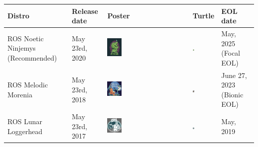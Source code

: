 \documentclass[../../main]{subfiles}
\begin{document}
\begin{table}[h!]
\begin{tcolorbox}[
    colback=red!5!white,colframe=red!75!black,
    title={\textbf{Built-in Field Types for Message Definition}},
    fonttitle=\bfseries, coltitle=white, width=\linewidth
]
    \centering
    \renewcommand{\arraystretch}{1} %
    \begin{longtable}{|
        >{\centering\arraybackslash}m{2.5cm}|
        >{\centering\arraybackslash}m{2cm}|
        >{\centering\arraybackslash}m{3cm}|
        >{\centering\arraybackslash}m{1.5cm}|
        >{\centering\arraybackslash}m{3cm}|}
    \hline 
    \rowcolor{red!20}
    \textbf{Distro} & \textbf{Release date} & \textbf{Poster} & \textbf{Turtle} & \textbf{EOL date} \\
    \hline \midrule

    ROS Noetic Ninjemys (Recommended) & May 23rd, 2020 & 
    \includegraphics[width=0.18\textwidth]{img/noetic.png} & 
    \includegraphics[width=0.08\textwidth]{img/noetic_c.png} & 
    May, 2025 (Focal EOL) \\ \hline

    ROS Melodic Morenia & May 23rd, 2018 & 
    \includegraphics[width=0.18\textwidth]{img/melodic_with_bg.png} & 
    \includegraphics[width=0.08\textwidth]{img/melodic.png} & 
    June 27, 2023 (Bionic EOL) \\ \hline

    ROS Lunar Loggerhead & May 23rd, 2017 & 
    \includegraphics[width=0.18\textwidth]{img/lunar_with_bg.png} & 
    \includegraphics[width=0.08\textwidth]{img/lunar.png} & 
    May, 2019 \\ \hline


\end{longtable}
\end{tcolorbox}
\end{table}
\end{document}
